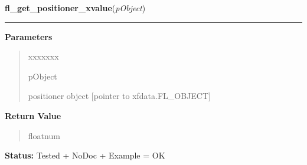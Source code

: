 \hspace{.8\funcindent}\begin{boxedminipage}{\funcwidth}

    \raggedright \textbf{fl\_get\_positioner\_xvalue}(\textit{pObject})

    \vspace{-1.5ex}

    \rule{\textwidth}{0.5\fboxrule}
\setlength{\parskip}{2ex}
\setlength{\parskip}{1ex}
      \textbf{Parameters}
      \vspace{-1ex}

      \begin{quote}
        \begin{Ventry}{xxxxxxx}

          \item[pObject]

          positioner object [pointer to xfdata.FL\_OBJECT]

        \end{Ventry}

      \end{quote}

      \textbf{Return Value}
    \vspace{-1ex}

      \begin{quote}
      floatnum

      \end{quote}

\textbf{Status:} Tested + NoDoc + Example = OK



    \end{boxedminipage}

    \label{xformslib:library:fl_set_positioner_xbounds}

    \vspace{0.5ex}

